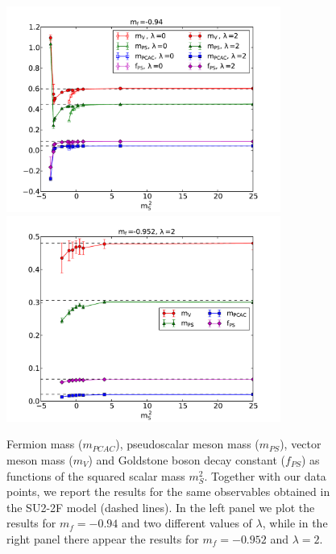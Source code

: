 \begin{figure}[b!] 
\begin{adjustwidth}{-4em}{-4em}
  \includegraphics[width=9cm,clip]{pics/mesons_094} ~\includegraphics[width=9cm,clip]{pics/mesons_0952} 
  \end{adjustwidth}
  \caption{Fermion mass ($m_{PCAC}$), pseudoscalar meson mass ($m_{PS}$), vector meson mass ($m_V$) and Goldstone boson decay constant ($f_{PS}$) as functions of the squared scalar mass $m_S^2$. Together with our data points, we report the results for the same observables obtained in the SU2-2F model (dashed lines). In the left panel we plot the results for $m_f = -0.94$ and two different values of $\lambda$, while in the right panel there appear the results for $m_f = -0.952$ and $\lambda = 2$.}
  \label{mesons_mS}
\end{figure}

